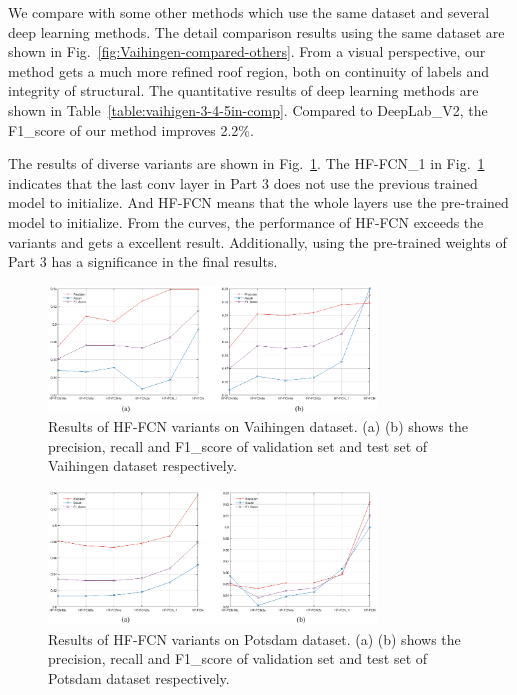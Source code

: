 We compare with some other methods which use the same dataset and several deep learning methods. The detail comparison results using the same dataset are shown in Fig.~\ref{fig:Vaihingen-compared-others}. From a visual perspective, our method gets a much more refined roof region, both on continuity of labels and integrity of structural. The quantitative results of deep learning methods are shown in Table~\ref{table:vaihigen-3-4-5in-comp}. Compared to DeepLab\_V2\cite{IEEEexample:chen2016deeplab}, the F1\_score of our method improves 2.2{\%}.

The results of diverse variants are shown in Fig.~\ref{fig:Vaihingen-variants}. The HF-FCN\_1 in Fig.~\ref{fig:Vaihingen-variants} indicates that the last conv layer in Part 3 does not use the previous trained model to initialize. And HF-FCN means that the whole layers use the pre-trained model to initialize. From the curves, the performance of HF-FCN exceeds the variants and gets a excellent result. Additionally, using the pre-trained weights of Part 3 has a significance in the final results.

\begin{figure}
\vspace{-0.2cm}
\setlength{\abovecaptionskip}{-0cm}
\setlength{\belowcaptionskip}{-1cm}  
\centering
\includegraphics[width=8.7cm]{Figures/vaihingen_variants.eps}
\caption{Results of HF-FCN variants on Vaihingen dataset. (a) (b) shows the precision, recall and F1\_score of validation set and test set of Vaihingen dataset respectively.}
\label{fig:Vaihingen-variants}
\end{figure}

\begin{figure}
\vspace{-0.2cm}
\setlength{\abovecaptionskip}{-0cm}
\setlength{\belowcaptionskip}{-1cm}  
\centering
\includegraphics[width=8.7cm]{Figures/Potsdam_variants.eps}
\caption{Results of HF-FCN variants on Potsdam dataset. (a) (b) shows the precision, recall and F1\_score of validation set and test set of Potsdam dataset respectively.}
\label{fig:Potsdam-variants}
\end{figure}

